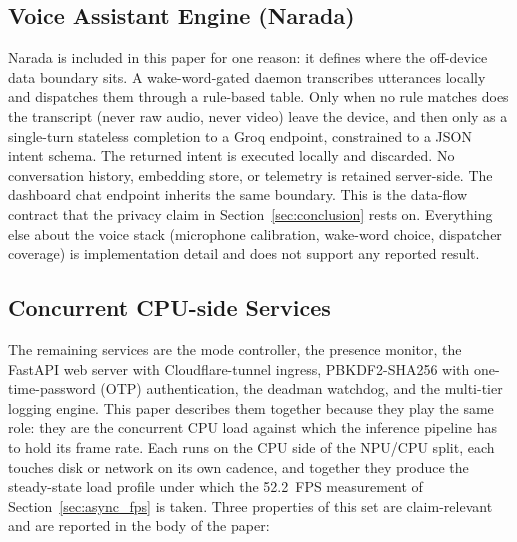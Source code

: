 \documentclass{ieeeaccess}
\begin{document}
\subsection{Voice Assistant Engine (Narada)}
\label{sec:groq_privacy}
Narada is included in this paper for one reason: it defines where the off-device data boundary sits. A wake-word-gated daemon transcribes utterances locally and dispatches them through a rule-based table. Only when no rule matches does the transcript (never raw audio, never video) leave the device, and then only as a single-turn stateless completion to a Groq endpoint, constrained to a JSON intent schema. The returned intent is executed locally and discarded. No conversation history, embedding store, or telemetry is retained server-side. The dashboard chat endpoint inherits the same boundary. This is the data-flow contract that the privacy claim in Section~\ref{sec:conclusion} rests on. Everything else about the voice stack (microphone calibration, wake-word choice, dispatcher coverage) is implementation detail and does not support any reported result.


\subsection{Concurrent CPU-side Services}
\label{sec:cpu_services}
The remaining services are the mode controller, the presence monitor, the FastAPI web server with Cloudflare-tunnel ingress, PBKDF2-SHA256 with one-time-password (OTP) authentication, the deadman watchdog, and the multi-tier logging engine. This paper describes them together because they play the same role: they are the concurrent CPU load against which the inference pipeline has to hold its frame rate. Each runs on the CPU side of the NPU/CPU split, each touches disk or network on its own cadence, and together they produce the steady-state load profile under which the 52.2~FPS measurement of Section~\ref{sec:async_fps} is taken. Three properties of this set are claim-relevant and are reported in the body of the paper:
\end{document}
